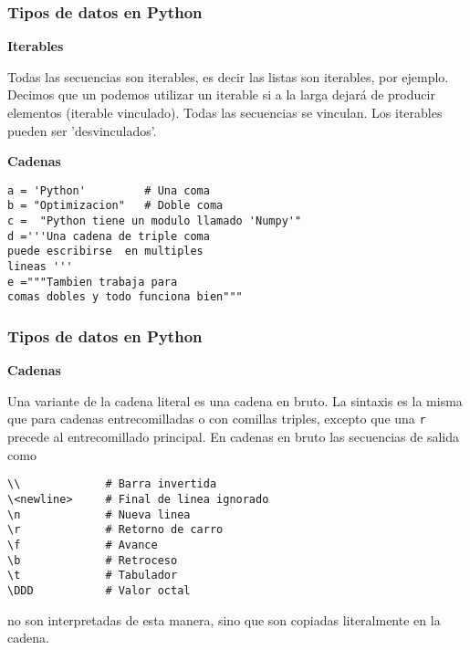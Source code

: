 \documentclass[10pt]{beamer}
\begin{document}
\begin{frame}[fragile]
\frametitle{Tipos de datos en Python}
\textbf{Iterables}

\vspace{0.2cm}

Todas las secuencias son iterables, es decir las listas son iterables, por ejemplo. Decimos que un podemos utilizar un iterable si a la larga dejar\'a de producir elementos (iterable vinculado). Todas las secuencias se vinculan. Los iterables pueden ser 'desvinculados'.  


\vspace{0.3cm}

\textbf{Cadenas}

\begin{lstlisting}
a = 'Python'         # Una coma
b = "Optimizacion"   # Doble coma
c =  "Python tiene un modulo llamado 'Numpy'"
d ='''Una cadena de triple coma
puede escribirse  en multiples
lineas '''
e ="""Tambien trabaja para 
comas dobles y todo funciona bien"""
\end{lstlisting}
\end{frame}

\begin{frame}[fragile]
\frametitle{Tipos de datos en Python}
\textbf{Cadenas}

\vspace{0.2cm}

Una variante de la cadena literal es una cadena en bruto. La sintaxis es la misma que para cadenas entrecomilladas o con comillas triples, excepto que una \texttt{r} precede al entrecomillado principal. En cadenas en bruto las secuencias de salida como

\vspace{0.2cm}

\begin{lstlisting}
\\             # Barra invertida
\<newline>     # Final de linea ignorado
\n             # Nueva linea
\r             # Retorno de carro
\f             # Avance
\b             # Retroceso
\t             # Tabulador
\DDD           # Valor octal
\end{lstlisting}

\vspace{0.2cm}

no son interpretadas de esta manera, sino que son copiadas literalmente en la cadena.
\end{frame}
\end{document}
